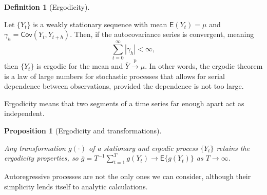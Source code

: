\documentclass[
  11pt,
  letterpaper,
]{scrbook}
\theoremstyle{definition}
\theoremstyle{plain}
\newtheorem{proposition}{Proposition}[chapter]
\theoremstyle{plain}
\theoremstyle{plain}
\theoremstyle{definition}
\theoremstyle{definition}
\newtheorem{definition}{Definition}[chapter]
\theoremstyle{plain}
\newtheorem{proposition}{Proposition}[chapter]
\theoremstyle{plain}
\theoremstyle{remark}
\begin{document}
\begin{definition}[Ergodicity]\protect\hypertarget{def-ergodic}{}\label{def-ergodic}

Let \(\{Y_t\}\) is a weakly stationary sequence with mean
\(\mathsf{E}(Y_t)=\mu\) and \(\gamma_h = \mathsf{Cov}(Y_t, Y_{t+h})\).
Then, if the autocovariance series is convergent, meaning
\[\sum_{t=0}^\infty |\gamma_h| < \infty,\] then \(\{Y_t\}\) is ergodic
for the mean and \(\overline{Y} \stackrel{\mathrm{p}}{\to} \mu\). In
other words, the ergodic theorem is a law of large numbers for
stochastic processes that allows for serial dependence between
observations, provided the dependence is not too large.

Ergodicity means that two segments of a time series far enough apart act
as independent.

\end{definition}

\begin{proposition}[Ergodicity and
transformations]\protect\hypertarget{prp-ergodicity-transfo}{}\label{prp-ergodicity-transfo}

Any transformation \(g(\cdot)\) of a stationary and ergodic process
\(\{Y_t\}\) retains the ergodicity properties, so
\(\overline{g} = T^{-1} \sum_{t=1}^T g(Y_t) \to \mathsf{E}\{g(Y_t)\}\)
as \(T \to \infty.\)

\end{proposition}

Autoregressive processes are not the only ones we can consider, although
their simplicity lends itself to analytic calculations.
\end{document}
